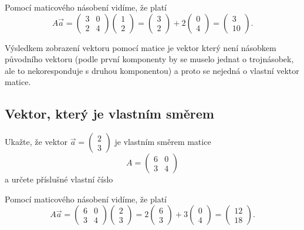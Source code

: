 \reseni
Pomocí maticového násobení vidíme, že platí
$$ A\vec a=
\begin{pmatrix}
  3& 0 \\ 2 &4
\end{pmatrix}
\begin{pmatrix}
  1\\2
\end{pmatrix}
=
\begin{pmatrix}
  3\\2
\end{pmatrix}
+2
\begin{pmatrix}
  0\\4
\end{pmatrix}
=
\begin{pmatrix}
  3\\10
\end{pmatrix}.
$$

Výsledkem zobrazení vektoru pomocí matice je vektor který není násobkem původního vektoru (podle první komponenty by se muselo jednat o trojnásobek, ale to nekoresponduje s druhou komponentou) a proto se nejedná o vlastní vektor matice.

\konec


\subsection{Vektor, který je vlastním směrem}

Ukažte, že vektor $\vec a=
  \begin{pmatrix}
    2\\3
  \end{pmatrix}
  $
  je vlastním směrem matice $$A=\begin{pmatrix}  6& 0 \\ 3 &4\end{pmatrix}$$
  a určete příslušné vlastní číslo

\reseni
Pomocí maticového násobení vidíme, že platí
$$A\vec a=
\begin{pmatrix}
  6& 0 \\ 3 &4
\end{pmatrix}
\begin{pmatrix}
  2\\3
\end{pmatrix}
=2
\begin{pmatrix}
  6\\3
\end{pmatrix}
+3
\begin{pmatrix}
  0\\4
\end{pmatrix}
=
\begin{pmatrix}
  12\\18
\end{pmatrix}.
$$

